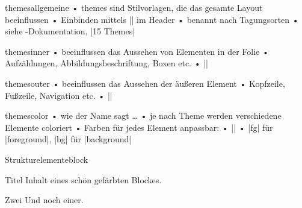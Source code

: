 \begin{frame}[fragile]{themes}{allgemeine}
• themes sind Stilvorlagen, die das gesamte Layout beeinflussen
• Einbinden mittels |\usetheme| im Header
• benannt nach Tagungsorten
• siehe -Dokumentation, |15 Themes|
\•
\end{frame}

\begin{frame}[fragile]{themes}{inner}
• beeinflussen das Aussehen von Elementen in der Folie
• Aufzählungen, Abbildungsbeschriftung, Boxen etc.
• |\useinnertheme|
\• 
\end{frame}

\begin{frame}[fragile]{themes}{outer}
• beeinflussen das Aussehen der äußeren Element
• Kopfzeile, Fußzeile, Navigation etc.
• |\useoutertheme|
\• 
\end{frame}

\begin{frame}[fragile]{themes}{color}
• wie der Name sagt …
• je nach Theme werden verschiedene Elemente coloriert
• Farben für jedes Element anpassbar:
• ||
• |fg| für |foreground|, |bg| für |background|
\•
\end{frame}


\begin{frame}[fragile]{Strukturelemente}{block}
\begin{LTXexample}
\begin{block}{Titel}
Inhalt eines schön gefärbten Blockes.
\end{block}
\begin{block}{Zwei}
Und noch einer.
\end{block}
\end{LTXexample}
\end{frame}

